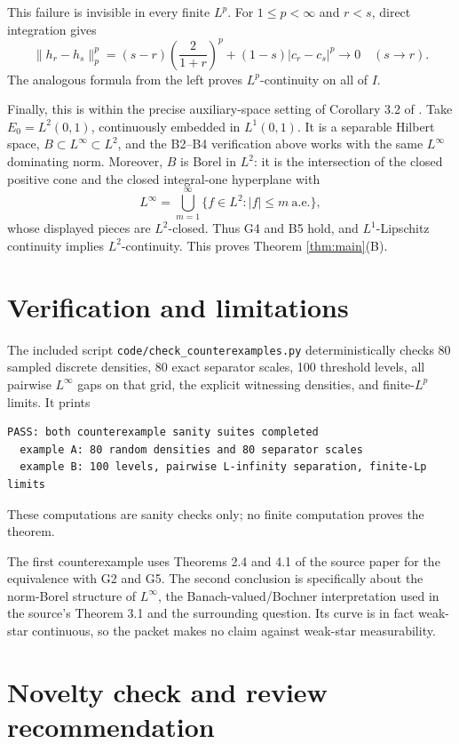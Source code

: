 \documentclass[11pt]{article}
\newcommand{\1}{\mathbf 1}
\begin{document}
This failure is invisible in every finite $L^p$.  For $1\leq p<\infty$ and
$r<s$, direct integration gives
\[
 \|h_r-h_s\|_p^p
 =(s-r)\left(\frac{2}{1+r}\right)^p
 +(1-s)|c_r-c_s|^p\longrightarrow0
 \quad(s\to r).
\]
The analogous formula from the left proves $L^p$-continuity on all of $I$.

Finally, this is within the precise auxiliary-space setting of Corollary 3.2
of \cite{Steinwart2015}.  Take $E_0=L^2(0,1)$, continuously embedded in
$L^1(0,1)$.  It is a separable Hilbert space, $B\subset L^\infty\subset L^2$,
and the B2--B4 verification above works with the same $L^\infty$ dominating
norm.  Moreover, $B$ is Borel in $L^2$: it is the intersection of the closed
positive cone and the closed integral-one hyperplane with
\[
 L^\infty=\bigcup_{m=1}^\infty\{f\in L^2:|f|\leq m\ \text{a.e.}\},
\]
whose displayed pieces are $L^2$-closed.  Thus G4 and B5 hold, and
$L^1$-Lipschitz continuity implies $L^2$-continuity.  This proves Theorem
\ref{thm:main}(B).

\section{Verification and limitations}

The included script
\texttt{code/check\_counterexamples.py} deterministically checks 80 sampled
discrete densities, 80 exact separator scales, 100 threshold levels, all
pairwise $L^\infty$ gaps on that grid, the explicit witnessing densities, and
finite-$L^p$ limits.  It prints
\begin{verbatim}
PASS: both counterexample sanity suites completed
  example A: 80 random densities and 80 separator scales
  example B: 100 levels, pairwise L-infinity separation, finite-Lp limits
\end{verbatim}
These computations are sanity checks only; no finite computation proves the
theorem.

The first counterexample uses Theorems 2.4 and 4.1 of the source paper for the
equivalence with G2 and G5.  The second conclusion is specifically about the
norm-Borel structure of $L^\infty$, the Banach-valued/Bochner interpretation
used in the source's Theorem 3.1 and the surrounding question.  Its curve is
in fact weak-star continuous, so the packet makes no claim against weak-star
measurability.

\section{Novelty check and review recommendation}
\end{document}

